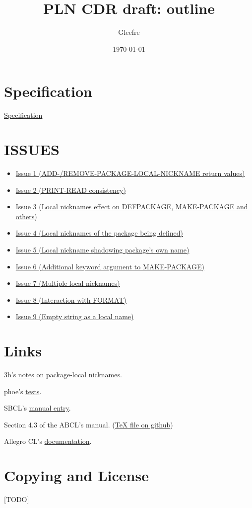 \documentclass[11pt]{article}
\author{Gleefre}
\date{\today}
\title{PLN CDR draft: outline}
\begin{document}

\section{Specification}
\label{sec:orgd683cf7}
\href{./spec.pdf}{Specification}
\section{ISSUES}
\label{sec:org49afb2e}
\begin{itemize}
\item \href{./issues/1.pdf}{Issue 1 (ADD-/REMOVE-PACKAGE-LOCAL-NICKNAME return values)}
\item \href{./issues/2.pdf}{Issue 2 (PRINT-READ consistency)}
\item \href{./issues/3.pdf}{Issue 3 (Local nicknames effect on DEFPACKAGE, MAKE-PACKAGE and others)}
\item \href{./issues/4.pdf}{Issue 4 (Local nicknames of the package being defined)}
\item \href{./issues/5.pdf}{Issue 5 (Local nickname shadowing package's own name)}
\item \href{./issues/6.pdf}{Issue 6 (Additional keyword argument to MAKE-PACKAGE)}
\item \href{./issues/7.pdf}{Issue 7 (Multiple local nicknames)}
\item \href{./issues/8.pdf}{Issue 8 (Interaction with FORMAT)}
\item \href{./issues/9.pdf}{Issue 9 (Empty string as a local name)}
\end{itemize}
\section{Links}
\label{sec:orgaf1fd08}
3b's \href{https://github.com/3b/package-local-nicknames/blob/master/docs.org}{notes} on package-local nicknames.

phoe's \href{https://github.com/phoe/trivial-package-local-nicknames}{tests}.

SBCL's \href{https://www.sbcl.org/manual/\#Package\_002dLocal-Nicknames}{manual entry}.

Section 4.3 of the ABCL's manual. (\href{https://github.com/armedbear/abcl/blob/master/doc/manual/abcl.tex\#L1249}{\TeX{} file on github})

Allegro CL's \href{https://franz.com/support/documentation/11.0/packages.html\#local-nicknames-1}{documentation}.
\section{Copying and License}
\label{sec:org0b138d7}
[TODO]
\end{document}
